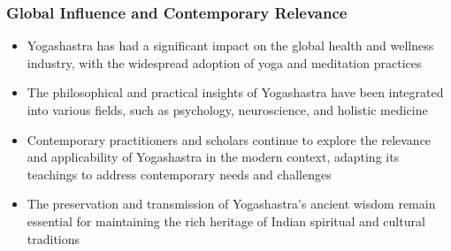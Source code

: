 \begin{frame}[fragile]\frametitle{Global Influence and Contemporary Relevance}
    \begin{itemize}
        \item Yogashastra has had a significant impact on the global health and wellness industry, with the widespread adoption of yoga and meditation practices
        \item The philosophical and practical insights of Yogashastra have been integrated into various fields, such as psychology, neuroscience, and holistic medicine
        \item Contemporary practitioners and scholars continue to explore the relevance and applicability of Yogashastra in the modern context, adapting its teachings to address contemporary needs and challenges
        \item The preservation and transmission of Yogashastra's ancient wisdom remain essential for maintaining the rich heritage of Indian spiritual and cultural traditions
    \end{itemize}
\end{frame}
